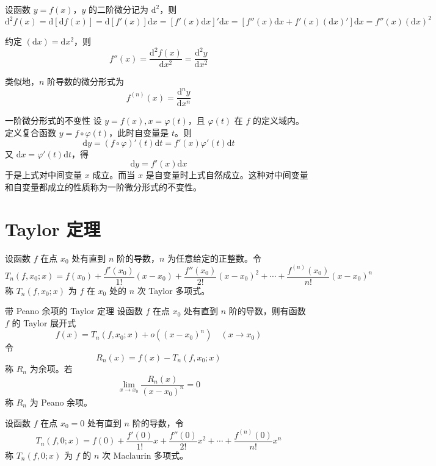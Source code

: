 设函数 $y = f(x)$，$y$ 的二阶微分记为 $\mathrm{d}^2$，则
\[\mathrm{d}^2f(x) = \mathrm{d}[\mathrm{d}f(x)] = \mathrm{d}[f'(x)]\mathrm{d}x = [f'(x)\mathrm{d}x]'\mathrm{d}x = [f''(x)\mathrm{d}x + f'(x)(\mathrm{d}x)']\mathrm{d}x = f''(x)(\mathrm{d}x)^2\]

约定 $(\mathrm{d}x) = \mathrm{d}x^2$，则
\[f''(x) = \frac{\mathrm{d}^{2}f(x)}{\mathrm{d}x^2} = \frac{\mathrm{d}^{2}y}{\mathrm{d}x^2}\]

类似地，$n$ 阶导数的微分形式为
\[f^{(n)}(x) = \frac{\mathrm{d}^{n}y}{\mathrm{d}x^n}\]

\begin{proposition}{一阶微分形式的不变性}
  设 $y = f(x), x = \varphi(t)$，且 $\varphi(t)$ 在 $f$ 的定义域内。定义复合函数 $y = f \circ \varphi(t)$，此时自变量是 $t$。则
  \[\mathrm{d}y = (f\circ\varphi)'(t)\mathrm{d}t = f'(x)\varphi'(t)\mathrm{d}t\]
  又 $\mathrm{d}x = \varphi'(t)\mathrm{d}t$，得
  \[\mathrm{d}y = f'(x)\mathrm{d}x\]
  于是上式对中间变量 $x$ 成立。而当 $x$ 是自变量时上式自然成立。这种对中间变量和自变量都成立的性质称为一阶微分形式的不变性。
\end{proposition}

\section{Taylor 定理}

\begin{definition}
  设函数 $f$ 在点 $x_0$ 处有直到 $n$ 阶的导数，$n$ 为任意给定的正整数。令
  \[T_n(f,x_0;x) = f(x_0) + \frac{f'(x_0)}{1!}(x - x_0) + \frac{f''(x_0)}{2!}(x - x_0)^2 + \cdots + \frac{f^{(n)}(x_0)}{n!}(x - x_0)^n\]
  称 $T_n(f,x_0;x)$ 为 $f$ 在 $x_0$ 处的 $n$ 次 Taylor 多项式。
\end{definition}

\begin{theorem}{带 Peano 余项的 Taylor 定理}
  设函数 $f$ 在点 $x_0$ 处有直到 $n$ 阶的导数，则有函数 $f$ 的 Taylor 展开式
  \[f(x) = T_n(f,x_0;x) + o((x - x_0)^n)\quad (x \to x_0)\]
  令
  \[R_n(x) = f(x) - T_n(f,x_0;x)\]
  称 $R_n$ 为余项。若
  \[\lim_{x \to x_0}\frac{R_n(x)}{(x - x_0)^n} = 0\]
  称 $R_n$ 为 Peano 余项。
\end{theorem}

\begin{definition}
  设函数 $f$ 在点 $x_0 = 0$ 处有直到 $n$ 阶的导数，令
  \[T_n(f,0;x) = f(0) + \frac{f'(0)}{1!}x + \frac{f''(0)}{2!}x^2 + \cdots + \frac{f^{(n)}(0)}{n!}x^n\]
  称 $T_n(f,0;x)$ 为 $f$ 的 $n$ 次 Maclaurin 多项式。
\end{definition}

